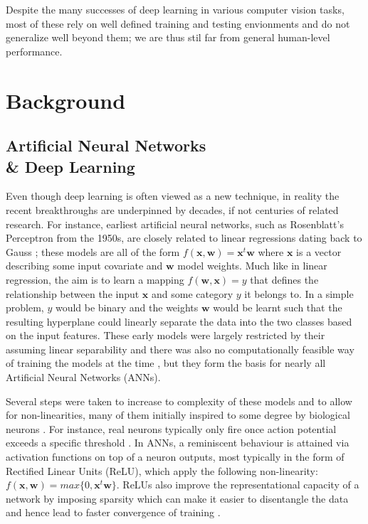 \documentclass[12pt]{report}
\begin{document}
Despite the many successes of deep learning in various computer vision tasks, most of these rely on well defined training and testing envionments and do not generalize well beyond them; we are thus stil far from general human-level performance.

\newpage

\chapter{Background}

\section{Artificial Neural Networks \\ \& Deep Learning}

Even though deep learning is often viewed as a new technique, in reality the recent breakthroughs are underpinned by decades, if not centuries of related research. For instance, earliest artificial neural networks, such as Rosenblatt's Perceptron \cite{Rosenblatt1958} from the 1950s, are closely related to linear regressions dating back to Gauss \cite{JurgenSchmidhuber2015}; these models are all of the form $f(\mathbf{x}, \mathbf{w})=\mathbf{x}^t \mathbf{w}$ where $\mathbf{x}$ is a vector describing some input covariate and $\mathbf{w}$ model weights. Much like in linear regression, the aim is to learn a mapping $f(\mathbf{w}, \mathbf{x}) = y$ that defines the relationship between the input $\mathbf{x}$ and some category $y$ it belongs to. In a simple problem,  $y$ would be binary and the weights $\mathbf{w}$ would be learnt such that the resulting hyperplane could linearly separate the data into the two classes based on the input features. These early models were largely restricted by their assuming linear separability and there was also no computationally feasible way of training the models at the time \cite{Goodfellow2016}, \cite{JurgenSchmidhuber2015} but they form the basis for nearly all Artificial Neural Networks (ANNs). 

Several steps were taken to increase to complexity of these models and to allow for non-linearities, many of them initially inspired to some degree by biological neurons \cite{Goodfellow16}. For instance, real neurons typically only fire once action potential exceeds a specific threshold \cite{Hodgkin1990}. In ANNs, a reminiscent behaviour is attained via activation functions on top of a neuron outputs, most typically in the form of Rectified Linear Units (ReLU), which apply the following non-linearity: $f(\mathbf{x}, \mathbf{w})=max\{0, \mathbf{x}^t \mathbf{w}\}$. ReLUs also improve the representational capacity of a network by imposing sparsity which can make it easier to disentangle the data \cite{Glorot2011} and hence lead to faster convergence of training \cite{Krizhevsky2012}.
\end{document}
